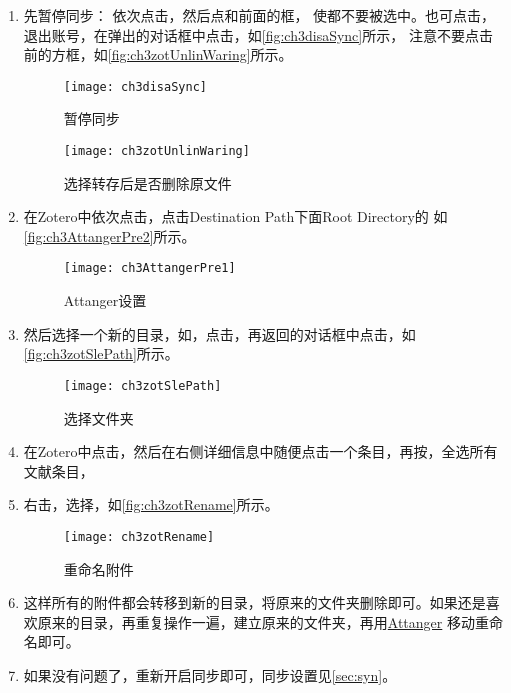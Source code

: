 \documentclass[theorem=false,mathfont=none,openany,sub3section]{easybook}
\begin{document}
\begin{enumerate}
	\item 先暂停同步：
	依次点击，然后点和前面的框，
	使都不要被选中。也可点击，退出账号，在弹出的对话框中点击，如\autoref{fig:ch3disaSync}所示，
	注意不要点击前的方框，如\autoref{fig:ch3zotUnlinWaring}所示。
	
	\begin{figure}[htbp]
		\centering
		\texttt{[image: ch3disaSync]}
		\caption{暂停同步}
		\label{fig:ch3disaSync}
	\end{figure}
	
	\begin{figure}[htbp]
		\centering
		\texttt{[image: ch3zotUnlinWaring]}
		\caption{选择转存后是否删除原文件}
		\label{fig:ch3zotUnlinWaring}
	\end{figure}
	\item 在Zotero中依次点击，点击Destination Path下面Root Directory的
	如\autoref{fig:ch3AttangerPre2}所示。
	
	\begin{figure}[htbp]
		\centering
		\texttt{[image: ch3AttangerPre1]}
		\caption{Attanger设置}
		\label{fig:ch3AttangerPre2}
	\end{figure}
	

	\item 然后选择一个新的目录，如，点击，再返回的对话框中点击，如\autoref{fig:ch3zotSlePath}所示。
	\begin{figure}[htbp]
		\centering
		\texttt{[image: ch3zotSlePath]}
		\caption{选择文件夹}
		\label{fig:ch3zotSlePath}
	\end{figure}
	
 
	\item 在Zotero中点击，然后在右侧详细信息中随便点击一个条目，再按，全选所有文献条目，
	\item 右击，选择，如\autoref{fig:ch3zotRename}所示。
	\begin{figure}[htbp]
		\centering
		\texttt{[image: ch3zotRename]}
		\caption{重命名附件}
		\label{fig:ch3zotRename}
	\end{figure}
	
	\item 这样所有的附件都会转移到新的目录，将原来的文件夹删除即可。如果还是喜欢原来的目录，再重复操作一遍，建立原来的文件夹，再用\href{https://github.com/MuiseDestiny/zotero-attanger}{Attanger}
	移动重命名即可。	
	\item 如果没有问题了，重新开启同步即可，同步设置见\cref{sec:syn}。	
\end{enumerate}
\end{document}
